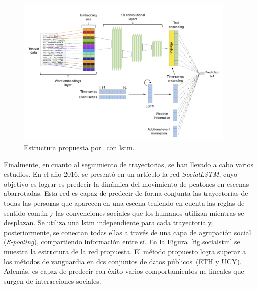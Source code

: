 \vspace{10pt}
\begin{figure}[H]
	\begin{center}
		\includegraphics[width=0.95\textwidth]{ figures/estadoarte/taxi.png}
		\caption{Estructura propuesta por~\cite{taxi} con \acrshort{lstm}.
		}
		\label{fig.taxi}
	\end{center}
\end{figure}
\vspace{-10pt}

Finalmente, en cuanto al seguimiento de trayectorias, se han llevado a cabo varios estudios. En el año 2016, se presentó en un artículo la red \textit{SocialLSTM}, cuyo objetivo es lograr es predecir la dinámica del movimiento de peatones en escenas abarrotadas. Esta red es capaz de predecir de forma conjunta las trayectorias de todas las personas que aparecen en una escena teniendo en cuenta las reglas de sentido común y las convenciones sociales que los humanos utilizan mientras se desplazan. Se utiliza una \acrshort{lstm} independiente para cada trayectoria y, posteriormente, se conectan todas ellas a través de una capa de agrupación social (\textit{S-pooling}), compartiendo información entre sí. En la Figura~\ref{fig.socialstm} se muestra la estructura de la red propuesta. El método propuesto logra superar a los métodos de vanguardia en dos conjuntos de datos públicos~(ETH y UCY). Además, es capaz de predecir con éxito varios comportamientos no lineales que surgen de interacciones sociales. 

